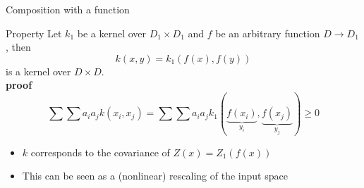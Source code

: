 \documentclass{beamer}
\begin{document}

\begin{frame}{Composition with a function}
\begin{block}{Property}
Let $k_1$ be a kernel over $D_1 \times D_1$ and $f$ be an arbitrary function $D \rightarrow D_1$, then
\begin{equation*}
k(x,y) = k_1(f(x),f(y))
\end{equation*}
is a kernel over $D \times D $.\\
\small
\textbf{proof}\\
\begin{equation*}
\sum \sum a_i  a_j k(x_i,x_j) = \sum \sum a_i a_j k_1(\underbrace{f(x_i)}_{y_i},\underbrace{f(x_j)}_{y_j}) \geq 0 
\end{equation*}
\end{block}
\vspace{5mm}
\begin{itemize}
\item $k$ corresponds to the covariance of $Z(x) = Z_1(f(x))$
\item This can be seen as a (nonlinear) rescaling of the input space
\end{itemize}
\end{frame}
\end{document}
